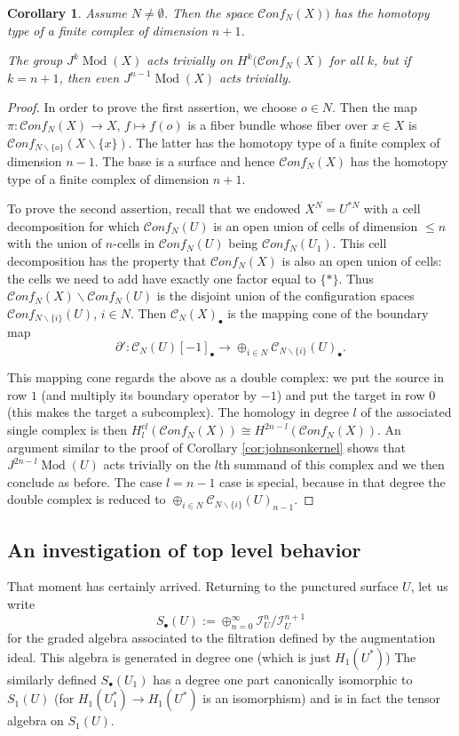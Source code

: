 \documentclass[12pt,letterpaper]{amsart}
\numberwithin{equation}{section}
\def\ssm{\smallsetminus}
\newcommand{\p}{\partial}
\def\Ical{{\mathcal I}}
\def\Cscr{{\mathscr C}}
\def\pt{{\scriptscriptstyle\bullet}}
\newcommand\conf{\mathscr{C}\!\mathit{onf}\!}
\newcommand\Mod{\operatorname{Mod}}
\newtheorem{corollary}[theorem]{Corollary}
\theoremstyle{remark}
\begin{document}
\begin{corollary}\label{cor:closedsurface}
Assume $N\not=\emptyset$. Then the  space $\conf_N(X))$ has the homotopy type of a finite complex of dimension $n+1$.

The group  $J^k\Mod(X)$ acts trivially  on $H^k(\conf_N(X)$ for all $k$, but if $k=n+1$, then even  
$J^{n-1}\Mod(X)$ acts trivially.
\end{corollary}
\begin{proof} 
In order to prove the first assertion, we choose $o\in N$. Then  the 
map $\pi: \conf_N(X)\to X$,  $f\mapsto f(o)$  is a  fiber bundle  whose fiber over $x\in X$ is $\conf_{N\ssm\{o\}}(X\ssm \{x\})$. 
The latter has the homotopy type of a finite complex of dimension $n-1$. The base is a surface  and hence  $\conf_N(X)$ has the homotopy type of a finite complex of dimension $n+1$.  

To prove the second assertion, recall  that we endowed  $X^N=U^{*N}$ with a cell decomposition  for which $\conf_N(U)$ is an open union of cells of dimension $\le n$ with the union of $n$-cells in $\conf_N(U)$ being $\conf_N(U_1)$. This   cell decomposition has the property that $\conf_N(X)$ is also an open union of cells: the cells 
we need to add have exactly one factor equal to $\{*\}$. Thus $\conf_N(X)\ssm \conf_N(U)$ is the disjoint union of the configuration spaces  $\conf_{N\ssm \{i\}}(U)$, $i\in N$. Then $\Cscr_N(X)_\pt$ is  the mapping cone of the boundary map
\[
\p': \Cscr_N(U)[-1]_\pt\to \oplus_{i\in N} \Cscr_{N\ssm \{i\}}(U)_\pt.
\]

This mapping cone regards the above  as a double complex: we put the source in row $1$ (and  multiply its  boundary operator by $-1$) and put the target in row $0$ (this makes the target a subcomplex). The  homology in degree $l$ of the  associated single complex is  then   $H^{cl}_l(\conf_N(X))\cong H^{2n-l}(\conf_N(X))$.
An argument similar to the proof of Corollary \ref{cor:johnsonkernel} shows  that $J^{2n-l}\Mod(U)$ acts trivially on  the  $l$th summand of this complex and we then conclude as before. The case $l=n-1$ case is special, because in that degree the double complex is reduced to 
$\oplus_{i\in N} \Cscr_{N\ssm \{i\}}(U)_{n-1}$.
\end{proof}

\subsection{An investigation of top level behavior}\label{subsection:toplevel}  That moment has certainly arrived. Returning to the punctured surface $U$, let us write
\[
S_\pt (U):=\oplus_{n=0}^\infty \Ical_{U}^{n}/\Ical_{U}^{n+1}
\]
for the graded algebra associated to the filtration defined by the augmentation ideal. This algebra is generated in degree one 
(which is just $H_1(U^*)$)
The similarly defined $S_\pt (U_1)$ has  a degree one part canonically isomorphic to $S_1 (U)$ (for $H_1(U_1^*)\to H_1(U^*)$ is an isomorphism)
and is in fact the tensor algebra on $S_1 (U)$.
\end{document}
